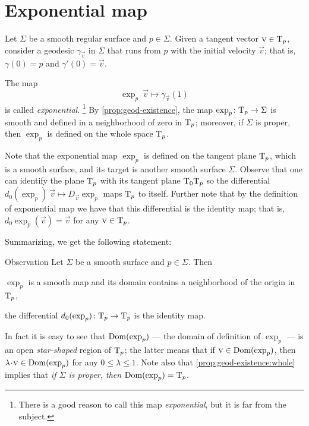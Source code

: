 \section{Exponential map}\label{sec:exp}

Let $\Sigma$ be a smooth regular surface and $p\in \Sigma$.
Given a tangent vector ${\text{\sc{v}}}\in \mathrm{T}_p$, consider a geodesic $\gamma_{\vec v}$ in $\Sigma$ that runs from $p$ with the initial velocity ${\vec v}$;  
that is, $\gamma(0)=p$ and $\gamma'(0)={\vec v}$.

The map 
\[\exp_p\:\vec v\mapsto \gamma_{\vec v}(1)\]
is called \emph{exponential}.%
\footnote{There is a good reason to call this map {}\emph{exponential}, but it is far from the subject.}
By \ref{prop:geod-existence}, the map $\exp_p\colon\mathrm{T}_p\to \Sigma$ is smooth and defined in a neighborhood of zero in $\mathrm{T}_p$;
moreover, if $\Sigma$ is proper, then $\exp_p$ is defined on the whole space $\mathrm{T}_p$.

Note that the exponential map $\exp_p$ 
is defined on the tangent plane $\mathrm{T}_p$, which is a smooth surface,
and its target is another smooth surface $\Sigma$.
Observe that one can identify the plane $\mathrm{T}_p$
with its tangent plane $\mathrm{T}_0\mathrm{T}_p$ so the differential $d_0(\exp_p)\:\vec v\mapsto D_{\vec v}\exp_p$ maps $\mathrm{T}_p$ to itself.
Further note that by the definition of exponential map we have that this differential is the identity map; that is, $d_0\exp_p(\vec v)=
\vec v$ for any $\text{\sc{v}}\in \mathrm{T}_p$.

Summarizing, we get the following statement:

\begin{thm}{Observation}\label{obs:d(exp)=1}
Let $\Sigma$ be a smooth surface and $p\in \Sigma$.
Then 
\begin{subthm}{}
$\exp_p$ is a smooth map and its domain contains a neighborhood of the origin in $\mathrm{T}_p$, 
\end{subthm}

\begin{subthm}{}
the differential $d_0(\exp_p)\colon\mathrm{T}_p\to \mathrm{T}_p$ is the identity map.
\end{subthm}

\end{thm}

In fact it is easy to see that $\mathop{\rm Dom}\nolimits(\exp_p)$ --- the domain of definition of $\exp_p$ --- is an open \emph{star-shaped} region of $\mathrm{T}_p$;
the latter means that if $\text{\sc{v}}\in \mathop{\rm Dom}\nolimits(\exp_p)$, then $\lambda\cdot\vec v\in \Dom(\exp_p)$ for any $0\le \lambda\le 1$.
Note also that \ref{prop:geod-existence:whole} implies that \emph{if $\Sigma$ is proper, then $\mathop{\rm Dom}\nolimits(\exp_p)=\mathrm{T}_p$}.


